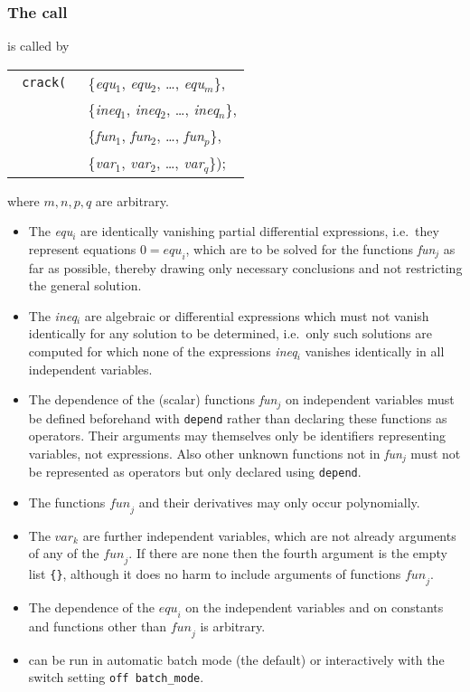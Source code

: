 \subsubsection{The call}
 is called by
\begin{center}
  \begin{tabular}{r@{}l}\tt
    crack( & \{\textit{equ}$_1$, \textit{equ}$_2$, \ldots , \textit{equ}$_m$\}, \\
    & \{\textit{ineq}$_1$, \textit{ineq}$_2$, \ldots , \textit{ineq}$_n$\}, \\
    & \{\textit{fun}$_1$, \textit{fun}$_2$, \ldots , \textit{fun}$_p$\}, \\
    & \{\textit{var}$_1$, \textit{var}$_2$, \ldots , \textit{var}$_q$\});
  \end{tabular}
\end{center}
where $m,n,p,q$ are arbitrary.
\begin{itemize}
\item The \textit{equ}$_i$ are identically vanishing partial
  differential expressions, i.e.\ they represent equations $0 =
  \mathit{equ}_i$, which are to be solved for the functions
  \textit{fun}$_j$ as far as possible, thereby drawing only necessary
  conclusions and not restricting the general solution.
\item The \textit{ineq}$_i$ are algebraic or differential expressions
  which must not vanish identically for any solution to be determined,
  i.e.\ only such solutions are computed for which none of the
  expressions \textit{ineq}$_i$ vanishes identically in all
  independent variables.
\item The dependence of the (scalar) functions \textit{fun}$_j$ on
  independent variables must be defined beforehand with
  \texttt{depend} rather than declaring these functions as operators.
  Their arguments may themselves only be identifiers representing
  variables, not expressions.  Also other unknown functions not in
  \textit{fun}$_j$ must not be represented as operators but only
  declared using \texttt{depend}.
\item The functions $\textit{fun}_j$ and their derivatives may only
  occur polynomially.
\item The $\textit{var}_k$ are further independent variables, which
  are not already arguments of any of the $\textit{fun}_j$.  If there
  are none then the fourth argument is the empty list \texttt{\{\}},
  although it does no harm to include arguments of functions
  $\textit{fun}_j$.
\item The dependence of the $\textit{equ}_i$ on the independent
  variables and on constants and functions other than $\textit{fun}_j$
  is arbitrary.
\item {} can be run in automatic batch mode (the default)
  or interactively with the switch setting \texttt{off batch\_mode}.
\end{itemize}

